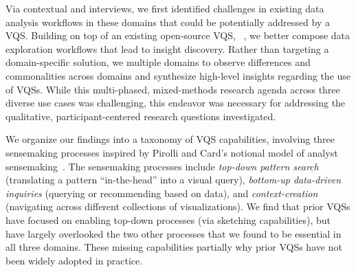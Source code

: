  \par {} Via contextual  and interviews, we first identified challenges in existing data analysis workflows in these domains that could be potentially addressed by a VQS. Building on top of an existing open-source VQS, \zv~\cite{Siddiqui2017,Siddiqui2017VLDB}, we  better compose data exploration workflows that lead to insight discovery. Rather than targeting a domain-specific solution, we  multiple domains to observe differences and commonalities across domains and synthesize high-level insights regarding the use of VQSs. While  this multi-phased, mixed-methods research agenda across three diverse use cases was challenging, this endeavor was necessary for addressing the qualitative, participant-centered research questions investigated.%
 \par We organize our  findings into a taxonomy of VQS capabilities, involving three sensemaking processes inspired by Pirolli and Card's notional model of analyst sensemaking~\cite{Pirolli}. The sensemaking processes include \emph{top-down pattern search} (translating a pattern ``in-the-head'' into a visual query), \emph{bottom-up data-driven inquiries} (querying or recommending based on data), and \emph{context-creation} (navigating across different collections of visualizations). We find that prior VQSs have focused on enabling top-down processes (via sketching capabilities), but have largely overlooked the two other processes that we found to be essential in all three domains. These missing capabilities partially  why prior VQSs have not been widely adopted in practice.
